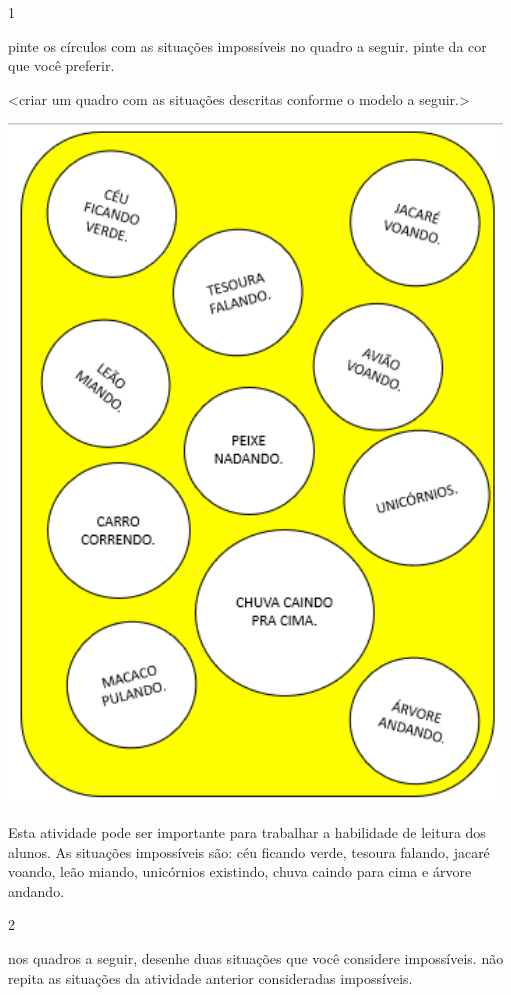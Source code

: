 
\num{1}

pinte os círculos com as situações impossíveis no quadro a seguir. pinte
da cor que você preferir.

\textless{}criar um quadro com as situações descritas conforme o modelo
a seguir.\textgreater{}

\includegraphics[width=5.16074in,height=7.09420in]{media/image80.png}

Esta atividade pode ser importante para trabalhar a
habilidade de leitura dos alunos. As situações impossíveis são: céu
ficando verde, tesoura falando, jacaré voando, leão miando, unicórnios existindo,
chuva caindo para cima e árvore andando.

\num{2}

nos quadros a seguir, desenhe duas situações que você considere
impossíveis. não repita as situações da atividade anterior consideradas impossíveis.

